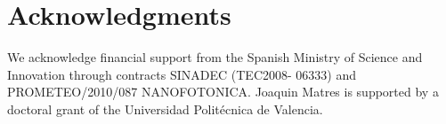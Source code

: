 \documentclass[journal]{IEEEtran}
\begin{document}


\section*{Acknowledgments}
We acknowledge financial support from the Spanish Ministry of Science and Innovation through contracts SINADEC (TEC2008- 06333) and PROMETEO/2010/087 NANOFOTONICA. Joaquin Matres is supported by a doctoral grant of the Universidad Polit\'ecnica de Valencia.





\end{document}
